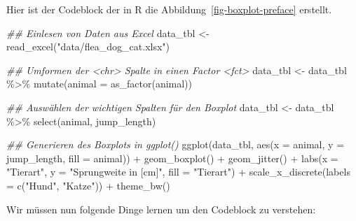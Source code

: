 \documentclass[
  letterpaper,
  DIV=11,
  oneside]{scrreport}
\newenvironment{Shaded}{\begin{snugshade}}{\end{snugshade}}
\newcommand{\AttributeTok}[1]{\textcolor[rgb]{0.40,0.45,0.13}{#1}}
\newcommand{\DocumentationTok}[1]{\textcolor[rgb]{0.37,0.37,0.37}{\textit{#1}}}
\newcommand{\FunctionTok}[1]{\textcolor[rgb]{0.28,0.35,0.67}{#1}}
\newcommand{\NormalTok}[1]{\textcolor[rgb]{0.00,0.23,0.31}{#1}}
\newcommand{\OtherTok}[1]{\textcolor[rgb]{0.00,0.23,0.31}{#1}}
\newcommand{\SpecialCharTok}[1]{\textcolor[rgb]{0.37,0.37,0.37}{#1}}
\newcommand{\StringTok}[1]{\textcolor[rgb]{0.13,0.47,0.30}{#1}}
\begin{document}
Hier ist der Codeblock der in R die Abbildung~\ref{fig-boxplot-preface}
erstellt.

\begin{Shaded}
\begin{Highlighting}[]
\DocumentationTok{\#\# Einlesen von Daten aus Excel}
\NormalTok{data\_tbl }\OtherTok{\textless{}{-}} \FunctionTok{read\_excel}\NormalTok{(}\StringTok{"data/flea\_dog\_cat.xlsx"}\NormalTok{)}

\DocumentationTok{\#\# Umformen der \textless{}chr\textgreater{} Spalte in einen Factor \textless{}fct\textgreater{}}
\NormalTok{data\_tbl }\OtherTok{\textless{}{-}}\NormalTok{ data\_tbl }\SpecialCharTok{\%\textgreater{}\%} 
  \FunctionTok{mutate}\NormalTok{(}\AttributeTok{animal =} \FunctionTok{as\_factor}\NormalTok{(animal))}

\DocumentationTok{\#\# Auswählen der wichtigen Spalten für den Boxplot}
\NormalTok{data\_tbl }\OtherTok{\textless{}{-}}\NormalTok{ data\_tbl }\SpecialCharTok{\%\textgreater{}\%} 
  \FunctionTok{select}\NormalTok{(animal, jump\_length) }

\DocumentationTok{\#\# Generieren des Boxplots in ggplot()}
\FunctionTok{ggplot}\NormalTok{(data\_tbl, }\FunctionTok{aes}\NormalTok{(}\AttributeTok{x =}\NormalTok{ animal, }\AttributeTok{y =}\NormalTok{ jump\_length, }
                     \AttributeTok{fill =}\NormalTok{ animal)) }\SpecialCharTok{+}
  \FunctionTok{geom\_boxplot}\NormalTok{() }\SpecialCharTok{+}
  \FunctionTok{geom\_jitter}\NormalTok{() }\SpecialCharTok{+}
  \FunctionTok{labs}\NormalTok{(}\AttributeTok{x =} \StringTok{"Tierart"}\NormalTok{, }\AttributeTok{y =} \StringTok{"Sprungweite in [cm]"}\NormalTok{, }
       \AttributeTok{fill =} \StringTok{"Tierart"}\NormalTok{) }\SpecialCharTok{+}
  \FunctionTok{scale\_x\_discrete}\NormalTok{(}\AttributeTok{labels =} \FunctionTok{c}\NormalTok{(}\StringTok{"Hund"}\NormalTok{, }\StringTok{"Katze"}\NormalTok{)) }\SpecialCharTok{+}
  \FunctionTok{theme\_bw}\NormalTok{()}
\end{Highlighting}
\end{Shaded}

Wir müssen nun folgende Dinge lernen um den Codeblock zu verstehen:
\end{document}

